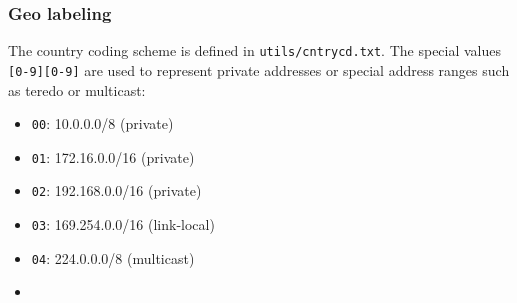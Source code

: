 \documentclass[documentation]{subfiles}
\begin{document}
\subsubsection{Geo labeling}\label{subnet}
The country coding scheme is defined in {\tt utils/cntrycd.txt}.
The special values {\tt [0-9][0-9]} are used to represent private addresses or special address ranges such as teredo or multicast:

\begin{minipage}{.45\textwidth}
    \begin{center}
        \begin{itemize}
            \item {\tt 00}: 10.0.0.0/8 (private)
            \item {\tt 01}: 172.16.0.0/16 (private)
            \item {\tt 02}: 192.168.0.0/16 (private)
            \item {\tt 03}: 169.254.0.0/16 (link-local)
            \item {\tt 04}: 224.0.0.0/8 (multicast)
            \item[]
        \end{itemize}
    \end{center}
\end{minipage}
\end{document}
